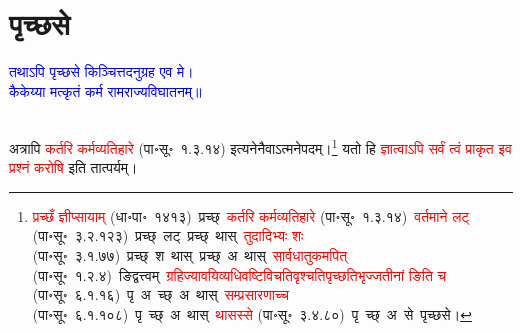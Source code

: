 \section[पृच्छसे]{पृच्छसे}
\centering\textcolor{blue}{तथाऽपि पृच्छसे किञ्चित्तदनुग्रह एव मे।\nopagebreak\\
कैकेय्या मत्कृतं कर्म रामराज्यविघातनम्॥}\nopagebreak\\
\\
\fontsize{14}{21}\selectfont\begin{sloppypar}\justifying\noindent\hspace{10mm} अत्रापि \textcolor{red}{कर्तरि कर्म\-व्यतिहारे} (पा॰सू॰~१.३.१४) इत्यनेनैवाऽत्मनेपदम्।\footnote{\textcolor{red}{प्रच्छँ ज्ञीप्सायाम्} (धा॰पा॰~१४१३)~\arrow प्रच्छ्~\arrow \textcolor{red}{कर्तरि कर्मव्यतिहारे} (पा॰सू॰~१.३.१४)~\arrow \textcolor{red}{वर्तमाने लट्} (पा॰सू॰~३.२.१२३)~\arrow प्रच्छ्~लट्~\arrow प्रच्छ्~थास्~\arrow \textcolor{red}{तुदादिभ्यः शः} (पा॰सू॰~३.१.७७)~\arrow प्रच्छ्~श~थास्~\arrow प्रच्छ्~अ~थास्~\arrow \textcolor{red}{सार्वधातुकमपित्} (पा॰सू॰~१.२.४)~\arrow ङिद्वत्त्वम्~\arrow \textcolor{red}{ग्रहिज्या\-वयिव्यधि\-वष्टिविचति\-वृश्चति\-पृच्छति\-भृज्जतीनां ङिति च} (पा॰सू॰~६.१.१६)~\arrow पृ~अ~च्छ्~अ~थास्~\arrow \textcolor{red}{सम्प्रसारणाच्च} (पा॰सू॰~६.१.१०८)~\arrow पृ~च्छ्~अ~थास्~\arrow \textcolor{red}{थासस्से} (पा॰सू॰~३.४.८०)~\arrow पृ~च्छ्~अ~से~\arrow पृच्छसे।} यतो हि \textcolor{red}{ज्ञात्वाऽपि सर्वं त्वं प्राकृत इव प्रश्नं करोषि} इति तात्पर्यम्।\end{sloppypar}
